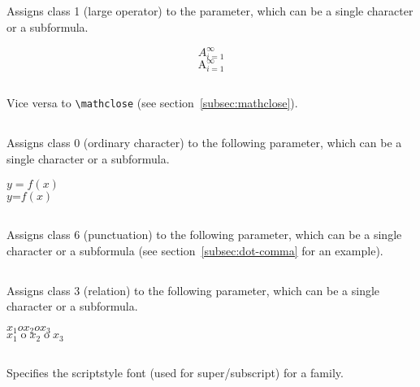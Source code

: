 \begin{table}[htb]
\subsection{}
Assigns class 1 (large operator) to the parameter, which can be a single character or a subformula.

\begin{LTXexample}[width=0.2\linewidth]
\[ A_{i=1}^{\infty} \]
\[ \mathop{A}_{i=1}^{\infty} \]
\end{LTXexample}

\subsection{}
Vice versa to \verb+\mathclose+ (see section~\ref{subsec:mathclose}).


\subsection{}
Assigns class 0 (ordinary character) to the following parameter, which can be a single character 
or a subformula.

\begin{LTXexample}[width=0.2\linewidth]
{\large
$y = f(x)$\\[5pt]
$y \mathord= f(x)$}
\end{LTXexample}

\subsection{}
Assigns class 6 (punctuation) to the following parameter, which can be a single character
or a subformula (see section~\ref{subsec:dot-comma} for an example).

\subsection{}
Assigns class 3 (relation) to the following parameter, which can be a single character
or a subformula.

\begin{LTXexample}[width=0.25\linewidth]
{\large
$x_1 o x_2 o x_3$\\[5pt]
$x_1\mathrel o x_2\mathrel o x_3$}
\end{LTXexample}


\subsection{}
Specifies the scriptstyle font (used for super/subscript) for a family.


\end{table}
